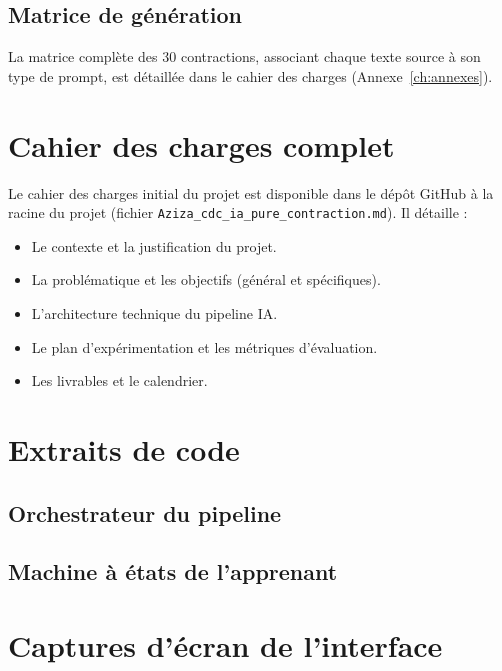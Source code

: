 \subsection{Matrice de génération}

La matrice complète des 30 contractions, associant chaque texte source à son type de prompt, est détaillée dans le cahier des charges (Annexe~\ref{ch:annexes}).

\section{Cahier des charges complet}

Le cahier des charges initial du projet est disponible dans le dépôt GitHub à la racine du projet (fichier \texttt{Aziza\_cdc\_ia\_pure\_contraction.md}). Il détaille :

\begin{itemize}
    \item Le contexte et la justification du projet.
    \item La problématique et les objectifs (général et spécifiques).
    \item L'architecture technique du pipeline IA.
    \item Le plan d'expérimentation et les métriques d'évaluation.
    \item Les livrables et le calendrier.
\end{itemize}

\section{Extraits de code}

\subsection{Orchestrateur du pipeline}



\subsection{Machine à états de l'apprenant}



\section{Captures d'écran de l'interface}

